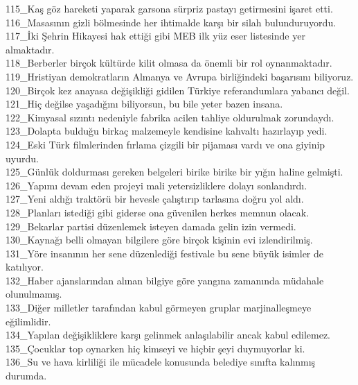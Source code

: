 \begin{myparindent}{0pt}
115\_Kaş göz hareketi yaparak garsona sürpriz pastayı getirmesini işaret etti.\\
116\_Masasının gizli bölmesinde her ihtimalde karşı bir silah bulunduruyordu.\\
117\_İki Şehrin Hikayesi hak ettiği gibi MEB ilk yüz eser listesinde yer almaktadır.\\
118\_Berberler birçok kültürde kilit olmasa da önemli bir rol oynanmaktadır.\\
119\_Hristiyan demokratların Almanya ve Avrupa birliğindeki başarısını biliyoruz.\\
120\_Birçok kez anayasa değişikliği gidilen Türkiye referandumlara yabancı değil.\\
121\_Hiç değilse yaşadığını biliyorsun, bu bile yeter bazen insana.\\
122\_Kimyasal sızıntı nedeniyle fabrika acilen tahliye oldurulmak zorundaydı.\\
123\_Dolapta bulduğu birkaç malzemeyle kendisine kahvaltı hazırlayıp yedi.\\
124\_Eski Türk filmlerinden fırlama çizgili bir pijaması vardı ve ona giyinip uyurdu.\\
125\_Günlük doldurması gereken belgeleri birike birike bir yığın haline gelmişti.\\
126\_Yapımı devam eden projeyi mali yetersizliklere dolayı sonlandırdı.\\
127\_Yeni aldığı traktörü bir hevesle çalıştırıp tarlasına doğru yol aldı.\\
128\_Planları istediği gibi giderse ona güvenilen herkes memnun olacak.\\
129\_Bekarlar partisi düzenlemek isteyen damada gelin izin vermedi.\\
130\_Kaynağı belli olmayan bilgilere göre birçok kişinin evi izlendirilmiş.\\
131\_Yöre insanının her sene düzenlediği festivale bu sene büyük isimler de katılıyor.\\
132\_Haber ajanslarından alınan bilgiye göre yangına zamanında müdahale olunulmamış.\\
133\_Diğer milletler tarafından kabul görmeyen gruplar marjinalleşmeye eğilimlidir.\\
134\_Yapılan değişikliklere karşı gelinmek anlaşılabilir ancak kabul edilemez.\\
135\_Çocuklar top oynarken hiç kimseyi ve hiçbir şeyi duymuyorlar ki.\\
136\_Su ve hava kirliliği ile mücadele konusunda belediye sınıfta kalınmış durumda.\\

\end{myparindent}
